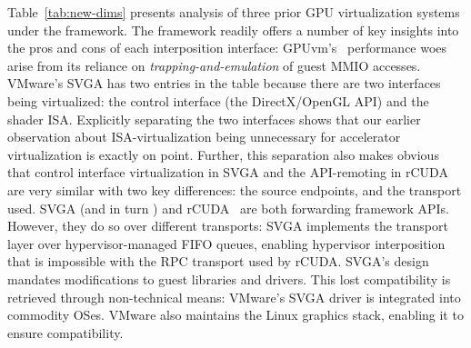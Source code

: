 Table~\ref{tab:new-dims} presents analysis of three prior GPU virtualization
systems under the \iemts framework. The \iemts framework readily offers a
number of key insights into the pros and cons of each interposition interface:
GPUvm's~\cite{suzuki2014gpuvm} performance woes arise from its reliance on
\textit{trapping-and-emulation} of guest MMIO accesses. VMware's SVGA has two
entries in the table because there are two interfaces being virtualized: the
control interface (the DirectX/OpenGL API) and the shader ISA. Explicitly
separating the two interfaces shows that our earlier observation about
ISA-virtualization being unnecessary for accelerator virtualization is exactly
on point. Further, this separation also makes obvious that control interface
virtualization in SVGA and the API-remoting in rCUDA are very similar with
two key differences: the source endpoints, and the transport used. SVGA (and
in turn \Trillium) and rCUDA~\cite{vmCUDA, rCUDA} are both forwarding
framework APIs. However, they do so over different transports: SVGA implements
the transport layer over hypervisor-managed FIFO queues, enabling hypervisor
interposition that is impossible with the RPC transport used by rCUDA.
SVGA's design mandates modifications to guest libraries and drivers.
This lost compatibility is retrieved through non-technical means: VMware's
SVGA driver is integrated into commodity OSes. VMware also maintains the Linux
graphics stack, enabling it to ensure compatibility.


\begin{table}[tt!]
\centering
\footnotesize
{} %
\caption{A possible ``sweet spot'' in the GPGPU virtualization design space?}
\label{tab:sweet-spot}
\end{table}

